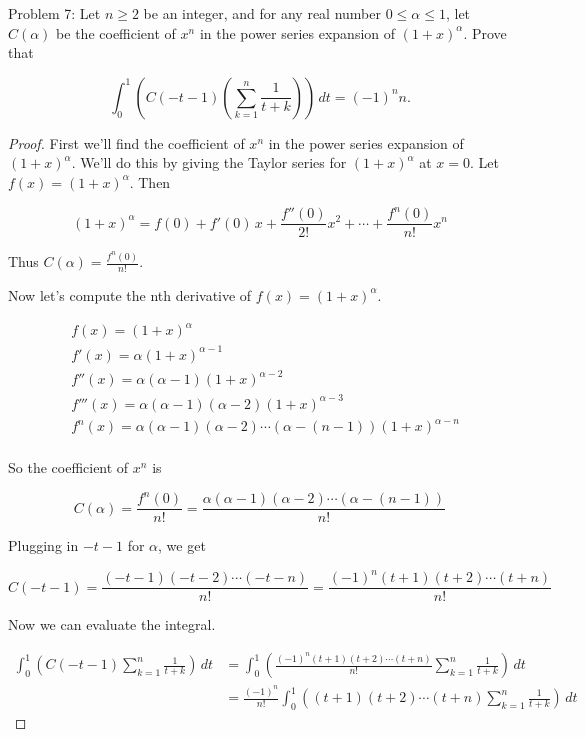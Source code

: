\usepackage{amsthm}

Problem 7: Let $n \ge 2$ be an integer, and for any real number $0 \le \alpha \le 1$, let $C(\alpha)$ be the coefficient of $x^n$ in the power series expansion of $(1+x)^\alpha$. Prove that

\[\int_0^1 \left(C(-t-1)\left(\sum_{k=1}^n \frac{1}{t+k}\right)\right)\,dt = (-1)^n n. \]

\begin{proof}
First we'll find the coefficient of $x^n$ in the power series expansion of $(1 + x)^\alpha$. We'll do this by giving the Taylor series for $(1 + x)^\alpha$ at $x = 0$. Let $f(x) = (1 + x)^\alpha$. Then

\[ 
(1 + x)^\alpha = f(0) + f'(0) \, x + \frac{f''(0)}{2!}x^2 + \cdots + \frac{f^n(0)}{n!}x^n 
\]

Thus $\displaystyle C(\alpha) = \frac{f^n(0)}{n!}$.

Now let's compute the nth derivative of $f(x) = (1 + x)^\alpha$.

\begin{align*}
& f(x) = (1 + x)^\alpha \\
& f'(x) = \alpha(1 + x)^{\alpha - 1} \\
& f''(x) = \alpha(\alpha - 1)(1 + x)^{\alpha - 2} \\
& f'''(x) = \alpha(\alpha - 1)(\alpha - 2)(1 + x)^{\alpha - 3} \\
& f^n(x) = \alpha(\alpha - 1)(\alpha - 2)\cdots(\alpha - (n-1))(1 + x)^{\alpha - n} \\
\end{align*}

So the coefficient of $x^n$ is

\[ C(\alpha) = \frac{f^n(0)}{n!} = \frac{\alpha(\alpha - 1)(\alpha - 2)\cdots(\alpha - (n-1))}{n!} \]

Plugging in $-t - 1$ for $\alpha$, we get

\[ C(-t - 1) = \frac{(-t - 1)(-t - 2)\cdots(-t - n)}{n!} = \frac{(-1)^n (t + 1)(t + 2)\cdots(t + n)}{n!} \]

Now we can evaluate the integral.

\begin{align*}
\int_0^1 \left(C(-t - 1) \sum_{k=1}^{n} \frac{1}{t + k} \right) \, dt 
&= \int_0^1 \left( \frac{(-1)^n (t + 1)(t + 2)\cdots(t + n)}{n!} \sum_{k=1}^{n} \frac{1}{t + k} \right) \, dt \\
&= \frac{(-1)^n}{n!} \int_0^1 \left( (t + 1)(t + 2)\cdots(t + n) \sum_{k=1}^{n} \frac{1}{t + k} \right) \, dt
\end{align*}


\end{proof}
